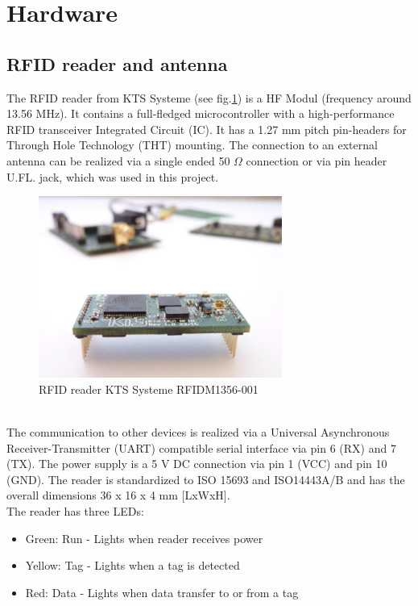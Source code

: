 \section{Hardware}\label{Sec_Har}

\subsection{RFID reader and antenna}
The RFID reader from KTS Systeme (see fig.\ref{Reader}) is a HF Modul (frequency around 13.56 MHz). It contains a full-fledged microcontroller with a high-performance RFID transceiver Integrated Circuit (IC). It has a 1.27 mm pitch pin-headers for Through Hole Technology (THT) mounting. The connection to an external antenna can be realized via a single ended 50 $\Omega$ connection or via pin header U.FL. jack, which was used in this project. \\
\begin{figure}[!htbp]
\centering
\includegraphics[width = 8cm]{Pictures/Reader}
\caption{RFID reader KTS Systeme RFIDM1356-001}
\label{Reader}
\end{figure}\\
The communication to other devices is realized via a Universal Asynchronous Receiver-Transmitter (UART) compatible serial interface via pin 6 (RX) and 7 (TX). The power supply is a 5 V DC connection via pin 1 (VCC) and pin 10 (GND). The reader is standardized to ISO 15693 and ISO14443A/B and has the overall dimensions 36 x 16 x 4 mm [LxWxH]\cite{KTSSysteme.2017}.\\
The reader has three LEDs:
\begin{itemize}
	\item Green: Run - Lights when reader receives power
	\item Yellow: Tag - Lights when a tag is detected
	\item Red: Data - Lights when data transfer to or from a tag
\end{itemize}
